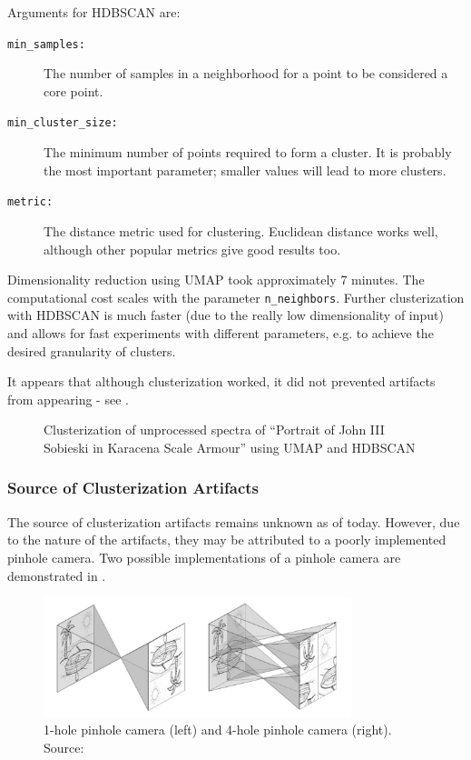 Arguments for HDBSCAN are:
\begin{description}
    \item[\texttt{min\_samples:}] The number of samples in a neighborhood for a point to be considered a core point.
    \item[\texttt{min\_cluster\_size:}] The minimum number of points required to form a cluster. It is probably the most important parameter; smaller values will lead to more clusters.
    \item[\texttt{metric:}] The distance metric used for clustering. Euclidean distance works well, although other popular metrics give good results too.
\end{description}

Dimensionality reduction using UMAP took approximately 7 minutes. 
The computational cost scales with the parameter \texttt{n\_neighbors}.
Further clusterization with HDBSCAN is much faster (due to the really low dimensionality of input) and allows for fast experiments with different parameters, e.g. to achieve the desired granularity of clusters.

It appears that although clusterization worked, it did not prevented artifacts from appearing - see .
\begin{figure}[H] 
  \centering     
   
  \caption{Clusterization of unprocessed spectra of ``Portrait of John III Sobieski in Karacena Scale Armour'' using UMAP and HDBSCAN}
  \label{fig:sobieski_clustered_hdbscan_noise}
\end{figure}

\newpage
\subsubsection{Source of Clusterization Artifacts}
The source of clusterization artifacts remains unknown as of today. 
However, due to the nature of the artifacts, they may be attributed to a poorly implemented pinhole camera.
Two possible implementations of a pinhole camera are demonstrated in .

\begin{figure}[H]
  \centering
  \includegraphics[width=0.8\textwidth]{img/pinhole_camera.png}
  \caption{1-hole pinhole camera (left) and 4-hole pinhole camera (right). Source: \cite{Lach2022}}
  \label{fig:pinhole-camera-implementations}
\end{figure}


